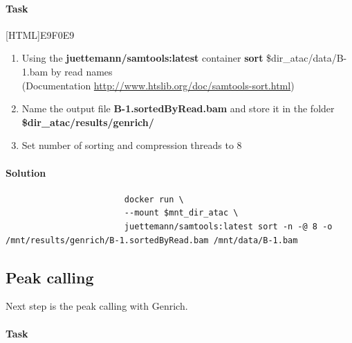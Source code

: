 \documentclass[12pt]{article}
\begin{document}
			\paragraph{Task}
			
				[HTML]{E9F0E9}{\parbox{\linewidth}{%
						\begin{enumerate}
							\item Using the \textbf{ juettemann/samtools:latest} container \textbf{sort} \$dir\_atac/data/B-1.bam by read names\\
							(Documentation \url{http://www.htslib.org/doc/samtools-sort.html})
							\item Name the output file \textbf{B-1.sortedByRead.bam} and store it in the folder \textbf{\$dir\_atac/results/genrich/} 
							\item Set number of sorting and compression threads to 8
						\end{enumerate}
				}}
			
			\paragraph{Solution}
				
				\begin{minipage}{\linewidth}
					\begin{lstlisting}
						docker run \
						--mount $mnt_dir_atac \
						juettemann/samtools:latest sort -n -@ 8 -o /mnt/results/genrich/B-1.sortedByRead.bam /mnt/data/B-1.bam	
					\end{lstlisting}
				\end{minipage}
		
		\subsection{Peak calling}
			Next step is the peak calling with Genrich. 
			
			\paragraph{Task}
			
\end{document}
